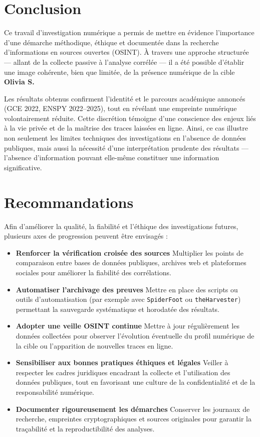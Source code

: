 \documentclass[a4paper,12pt]{report}
\begin{document}
\section*{Conclusion}

Ce travail d’investigation numérique a permis de mettre en évidence l’importance d’une démarche méthodique, éthique et documentée dans la recherche d’informations en sources ouvertes (OSINT).  
À travers une approche structurée — allant de la collecte passive à l’analyse corrélée — il a été possible d’établir une image cohérente, bien que limitée, de la présence numérique de la cible \textbf{Olivia S.}  

Les résultats obtenus confirment l’identité et le parcours académique annoncés (GCE 2022, ENSPY 2022–2025), tout en révélant une empreinte numérique volontairement réduite.  
Cette discrétion témoigne d’une conscience des enjeux liés à la vie privée et de la maîtrise des traces laissées en ligne.  
Ainsi, ce cas illustre non seulement les limites techniques des investigations en l’absence de données publiques, mais aussi la nécessité d’une interprétation prudente des résultats — l’absence d’information pouvant elle-même constituer une information significative.  

\section*{Recommandations}

Afin d’améliorer la qualité, la fiabilité et l’éthique des investigations futures, plusieurs axes de progression peuvent être envisagés :

\begin{itemize}
	\item \textbf{Renforcer la vérification croisée des sources}  
		Multiplier les points de comparaison entre bases de données publiques, archives web et plateformes sociales pour améliorer la fiabilité des corrélations.

	\item \textbf{Automatiser l’archivage des preuves}  
		Mettre en place des scripts ou outils d’automatisation (par exemple avec \texttt{SpiderFoot} ou \texttt{theHarvester}) permettant la sauvegarde systématique et horodatée des résultats.

	\item \textbf{Adopter une veille OSINT continue}  
		Mettre à jour régulièrement les données collectées pour observer l’évolution éventuelle du profil numérique de la cible ou l’apparition de nouvelles traces en ligne.

	\item \textbf{Sensibiliser aux bonnes pratiques éthiques et légales}  
		Veiller à respecter les cadres juridiques encadrant la collecte et l’utilisation des données publiques, tout en favorisant une culture de la confidentialité et de la responsabilité numérique.

	\item \textbf{Documenter rigoureusement les démarches}  
		Conserver les journaux de recherche, empreintes cryptographiques et sources originales pour garantir la traçabilité et la reproductibilité des analyses.
\end{itemize}
\end{document}
